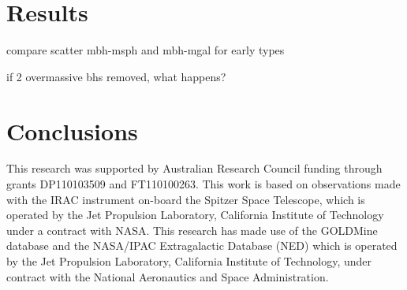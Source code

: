 \documentclass[preprint2]{emulateapj}
\begin{document}
\begin{table}
\begin{tabular}{llccccc}
		   
		  
\hline 
\hline
\end{tabular}
\label{tab:lreg} 
\end{table}

\section{Results}
\label{sec:res}

compare scatter mbh-msph and mbh-mgal for early types

if 2 overmassive bhs removed, what happens?



\section{Conclusions}
\label{sec:concl}



\acknowledgments
This research was supported by Australian Research Council funding through grants
DP110103509 and FT110100263.
This work is based on observations made with the IRAC instrument \citep{fazio2004IRAC} 
on-board the Spitzer Space Telescope, 
which is operated by the Jet Propulsion Laboratory, 
California Institute of Technology under a contract with NASA.
This research has made use of the GOLDMine database \citep{goldmine} and the NASA/IPAC Extragalactic Database (NED) 
which is operated by the Jet Propulsion Laboratory, California Institute of Technology, 
under contract with the National Aeronautics and Space Administration. 





\clearpage
\end{document}
